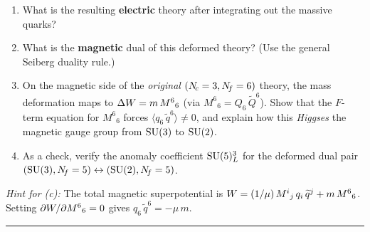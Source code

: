 \documentclass[11pt,a4paper]{article}
\begin{document}
\begin{enumerate}[label=(\alph*)]
  \item What is the resulting \textbf{electric} theory after integrating
    out the massive quarks?

  \item What is the \textbf{magnetic} dual of this deformed theory?
    (Use the general Seiberg duality rule.)

  \item On the magnetic side of the \emph{original} $(N_{\!c} = 3, N_{\!f} = 6)$
    theory, the mass deformation maps to
    $\Delta W = m\, M^6{}_6$ (via $M^6{}_6 = Q_6\, \widetilde{Q}^6$).
    Show that the $F$-term equation for $M^6{}_6$ forces
    $\langle q_6\, \widetilde{q}^6\rangle \neq 0$, and explain how this
    \emph{Higgses} the magnetic gauge group from $\mathrm{SU}(3)$ to $\mathrm{SU}(2)$.

  \item As a check, verify the anomaly coefficient $\mathrm{SU}(5)_L^3$ for the
    deformed dual pair $(\mathrm{SU}(3), N_{\!f} = 5) \leftrightarrow (\mathrm{SU}(2),
    N_{\!f} = 5)$.
\end{enumerate}

\medskip

\noindent\textit{Hint for (c):}  The total magnetic superpotential is
$W = (1/\mu)\, M^i{}_j\, q_i\, \widetilde{q}^j + m\, M^6{}_6$.
Setting $\partial W/\partial M^6{}_6 = 0$ gives
$q_6\,\widetilde{q}^6 = -\mu\, m$.

\bigskip
\hrule
\bigskip
\end{document}
